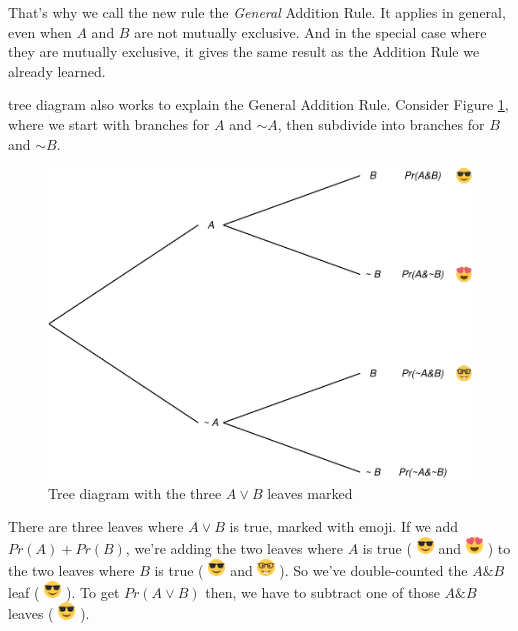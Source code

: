 \documentclass[justified]{tufte-book}
\renewcommand{\neg}{\mathbin{\sim}}
\renewcommand{\wedge}{\mathbin{\&}}
\newcommand{\p}{Pr}
\theoremstyle{definition}
\theoremstyle{definition}
\theoremstyle{definition}
\theoremstyle{remark}
\begin{document}
That's why we call the new rule the \emph{General} Addition Rule. It
applies in general, even when \(A\) and \(B\) are not mutually
exclusive. And in the special case where they are mutually exclusive, it
gives the same result as the Addition Rule we already learned.

 tree diagram also works to explain the General Addition
Rule. Consider Figure \ref{fig:gatree}, where we start with branches for
\(A\) and \(\neg A\), then subdivide into branches for \(B\) and
\(\neg B\).

\begin{figure}
\includegraphics{_main_files/figure-latex/gatree-1} \caption[Tree diagram with the three $A \vee B$ leaves marked]{Tree diagram with the three $A \vee B$ leaves marked}\label{fig:gatree}
\end{figure}

There are three leaves where \(A \vee B\) is true, marked with emoji. If
we add \(\p(A) + \p(B)\), we're adding the two leaves where \(A\) is
true ( \includegraphics[width=0.18in]{img/emoji_shades_small} and
\includegraphics[width=0.18in]{img/emoji_hearts_small} ) to the two
leaves where \(B\) is true (
\includegraphics[width=0.18in]{img/emoji_shades_small} and
\includegraphics[width=0.18in]{img/emoji_nerd_small} ). So we've
double-counted the \(A \wedge B\) leaf (
\includegraphics[width=0.18in]{img/emoji_shades_small} ). To get
\(\p(A \vee B)\) then, we have to subtract one of those \(A \wedge B\)
leaves ( \includegraphics[width=0.18in]{img/emoji_shades_small} ).
\end{document}
